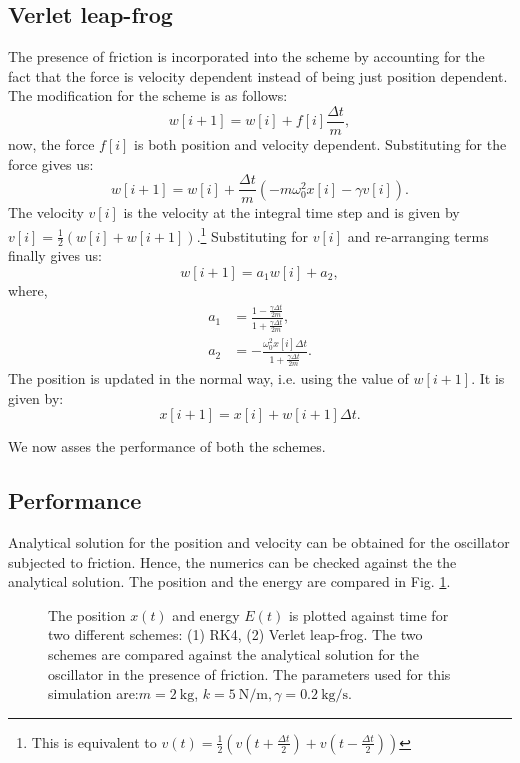 \documentclass[10pt]{article}
\begin{document}
\subsection*{Verlet leap-frog}
The presence of friction is incorporated into the scheme by accounting for the fact that the force is velocity dependent instead of being just position dependent. The modification for the scheme is as follows:
%
\begin{equation*}
w[i+1] = w[i] + f[i]\frac{\Delta t}{m},
\end{equation*}
%
now, the force $f[i]$ is both position and velocity dependent. Substituting for the force gives us:
%
\begin{equation*}
w[i+1] = w[i] + \frac{\Delta t}{m}( -m\omega_{0}^2 x[i] - \gamma v[i] ).
\end{equation*} 
%
The velocity $v[i]$ is the velocity at the integral time step and is given by $v[i] = \frac{1}{2} ( w[i] + w[i+1] )$.\footnote{This is equivalent to $v(t) = \frac{1}{2} ( v(t + \frac{\Delta t}{2} ) + v(t - \frac{\Delta t}{2} ) )$ } Substituting for $v[i]$ and re-arranging terms finally gives us:
%
\begin{equation}
w[i+1] = a_{1}w[i] + a_{2},
\end{equation}
%
where,
%
\begin{eqnarray}
a_{1} &= \frac{1 - \frac{\gamma \Delta t}{2m}}{1 + \frac{\gamma \Delta t}{2m} }, \\
a_{2} &= -\frac{\omega_{0}^2 x[i] \Delta t}{1 + \frac{\gamma \Delta t}{2m}}.
\end{eqnarray}
%
The position is updated in the normal way, i.e. using the value of $w[i+1]$. It is given by:
\begin{equation}
x[i+1] = x[i] + w[i+1]\Delta t.
\end{equation}

We now asses the performance of both the schemes. 

\subsection*{Performance}
Analytical solution for the position and velocity can be obtained for the oscillator subjected to friction. Hence, the numerics can be checked against the the analytical solution. The position and the energy are compared in Fig. \ref{fig:ode45_vs_VerletLF_friction}. 

\begin{figure}[!htb]
\centering


\caption{The position $x(t)$ and energy $E(t)$ is plotted against time for two different schemes: (1) RK4, (2) Verlet leap-frog. The two schemes are compared against the analytical solution for the oscillator in the presence of friction. The parameters used for this simulation are:$m=2\ \mathrm{kg}$, $k=5\ \mathrm{N/m}, \gamma=0.2\ \mathrm{kg/s}$.}
\label{fig:ode45_vs_VerletLF_friction}
\end{figure} 
\end{document}
